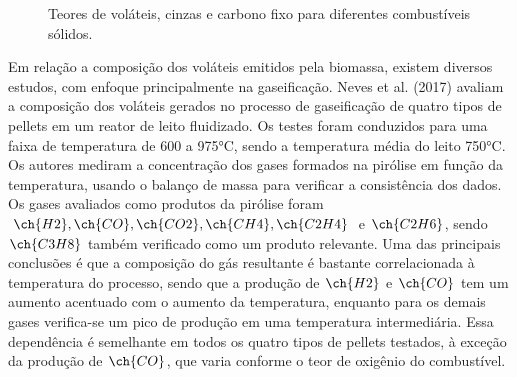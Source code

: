 \begin{figure}
	\centering
	\caption{Teores de voláteis, cinzas e carbono fixo para diferentes combustíveis sólidos.}
	\label{fig:volatiles}
\end{figure}

Em relação a composição dos voláteis emitidos pela biomassa, existem diversos estudos, com enfoque principalmente na gaseificação. Neves et al. (2017) avaliam a composição dos voláteis gerados no processo de gaseificação de quatro tipos de pellets em um reator de leito fluidizado. Os testes foram conduzidos para uma faixa de temperatura de 600 a 975°C, sendo a temperatura média do leito 750°C. Os autores mediram a concentração dos gases formados na pirólise em função da temperatura, usando o balanço de massa para verificar a consistência dos dados. Os gases avaliados como produtos da pirólise foram $\ch{H2}, \ch{CO}, \ch{CO2}, \ch{CH4}, \ch{C2H4}$ e $\ch{C2H6}$, sendo $\ch{C3H8}$ também verificado como um produto relevante. Uma das principais conclusões é que a composição do gás resultante é bastante correlacionada à temperatura do processo, sendo que a produção de $\ch{H2}$ e $\ch{CO}$ tem um aumento acentuado com o aumento da temperatura, enquanto para os demais gases verifica-se um pico de produção em uma temperatura intermediária. Essa dependência é semelhante em todos os quatro tipos de pellets testados, à exceção da produção de $\ch{CO}$, que varia conforme o teor de oxigênio do combustível. 

